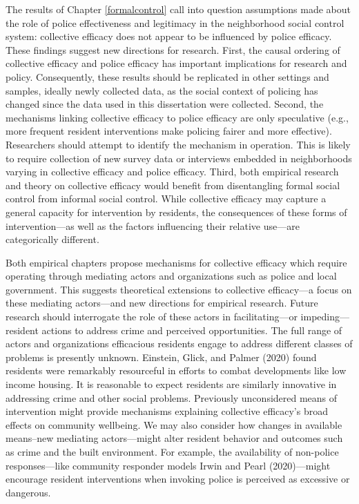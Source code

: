 \documentclass [11pt, proquest] {uwthesis}[2015/03/03]
\begin{document}
The results of Chapter \ref{formalcontrol} call into question assumptions made about the role of police effectiveness and legitimacy in the neighborhood social control system: collective efficacy does not appear to be influenced by police efficacy. These findings suggest new directions for research. First, the causal ordering of collective efficacy and police efficacy has important implications for research and policy. Consequently, these results should be replicated in other settings and samples, ideally newly collected data, as the social context of policing has changed since the data used in this dissertation were collected. Second, the mechanisms linking collective efficacy to police efficacy are only speculative (e.g., more frequent resident interventions make policing fairer and more effective). Researchers should attempt to identify the mechanism in operation. This is likely to require collection of new survey data or interviews embedded in neighborhoods varying in collective efficacy and police efficacy. Third, both empirical research and theory on collective efficacy would benefit from disentangling formal social control from informal social control. While collective efficacy may capture a general capacity for intervention by residents, the consequences of these forms of intervention---as well as the factors influencing their relative use---are categorically different.

Both empirical chapters propose mechanisms for collective efficacy which require operating through mediating actors and organizations such as police and local government. This suggests theoretical extensions to collective efficacy---a focus on these mediating actors---and new directions for empirical research. Future research should interrogate the role of these actors in facilitating---or impeding---resident actions to address crime and perceived opportunities. The full range of actors and organizations efficacious residents engage to address different classes of problems is presently unknown. Einstein, Glick, and Palmer (2020) found residents were remarkably resourceful in efforts to combat developments like low income housing. It is reasonable to expect residents are similarly innovative in addressing crime and other social problems. Previously unconsidered means of intervention might provide mechanisms explaining collective efficacy's broad effects on community wellbeing. We may also consider how changes in available means--new mediating actors---might alter resident behavior and outcomes such as crime and the built environment. For example, the availability of non-police responses---like community responder models Irwin and Pearl (2020)---might encourage resident interventions when invoking police is perceived as excessive or dangerous.
\end{document}
